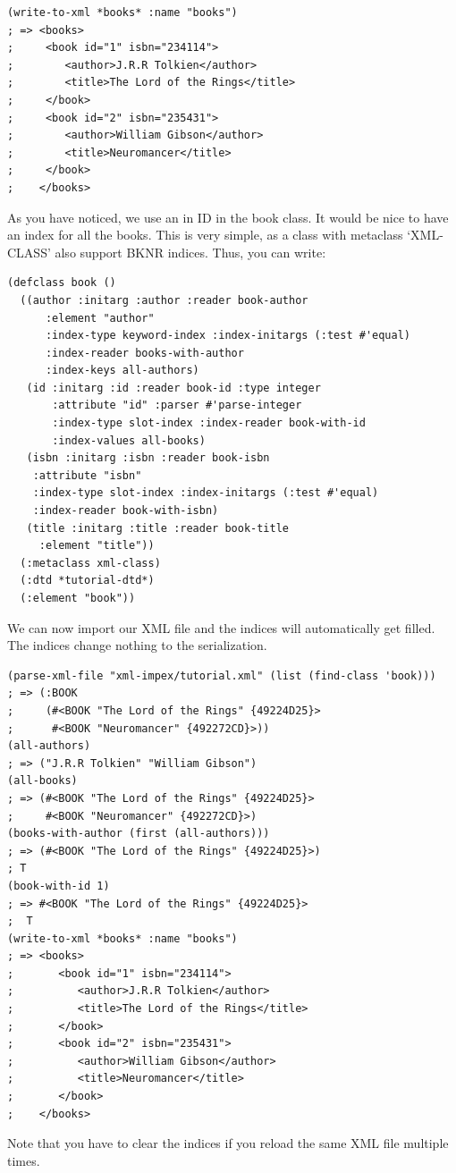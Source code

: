 \begin{Verbatim}[fontsize=\small,frame=leftline,framerule=0.9mm,rulecolor=\color{gray},framesep=5.1mm,xleftmargin=5mm,fontfamily=cmtt]
(write-to-xml *books* :name "books")
; => <books>
;     <book id="1" isbn="234114">
;        <author>J.R.R Tolkien</author>
;        <title>The Lord of the Rings</title>
;     </book>
;     <book id="2" isbn="235431">
;        <author>William Gibson</author>
;        <title>Neuromancer</title>
;     </book>
;    </books>
\end{Verbatim}
As you have noticed, we use an in ID in the book class. It would
be nice to have an index for all the books. This is very simple,
as a class with metaclass `XML-CLASS' also support BKNR
indices. Thus, you can write:

\begin{Verbatim}[fontsize=\small,frame=leftline,framerule=0.9mm,rulecolor=\color{gray},framesep=5.1mm,xleftmargin=5mm,fontfamily=cmtt]
(defclass book ()
  ((author :initarg :author :reader book-author
      :element "author"
      :index-type keyword-index :index-initargs (:test #'equal)
      :index-reader books-with-author
      :index-keys all-authors)
   (id :initarg :id :reader book-id :type integer
       :attribute "id" :parser #'parse-integer
       :index-type slot-index :index-reader book-with-id
       :index-values all-books)
   (isbn :initarg :isbn :reader book-isbn
    :attribute "isbn"
    :index-type slot-index :index-initargs (:test #'equal)
    :index-reader book-with-isbn)
   (title :initarg :title :reader book-title
     :element "title"))
  (:metaclass xml-class)
  (:dtd *tutorial-dtd*)
  (:element "book"))
\end{Verbatim}
We can now import our XML file and the indices will automatically
get filled. The indices change nothing to the serialization.

\begin{Verbatim}[fontsize=\small,frame=leftline,framerule=0.9mm,rulecolor=\color{gray},framesep=5.1mm,xleftmargin=5mm,fontfamily=cmtt]
(parse-xml-file "xml-impex/tutorial.xml" (list (find-class 'book)))
; => (:BOOK
;     (#<BOOK "The Lord of the Rings" {49224D25}>
;      #<BOOK "Neuromancer" {492272CD}>))
(all-authors)
; => ("J.R.R Tolkien" "William Gibson")
(all-books)
; => (#<BOOK "The Lord of the Rings" {49224D25}>
;     #<BOOK "Neuromancer" {492272CD}>)
(books-with-author (first (all-authors)))
; => (#<BOOK "The Lord of the Rings" {49224D25}>)
; T
(book-with-id 1)
; => #<BOOK "The Lord of the Rings" {49224D25}>
;  T
(write-to-xml *books* :name "books")
; => <books>
;       <book id="1" isbn="234114">
;          <author>J.R.R Tolkien</author>
;          <title>The Lord of the Rings</title>
;       </book>
;       <book id="2" isbn="235431">
;          <author>William Gibson</author>
;          <title>Neuromancer</title>
;       </book>
;    </books>
\end{Verbatim}
Note that you have to clear the indices if you reload the same XML
file multiple times.

